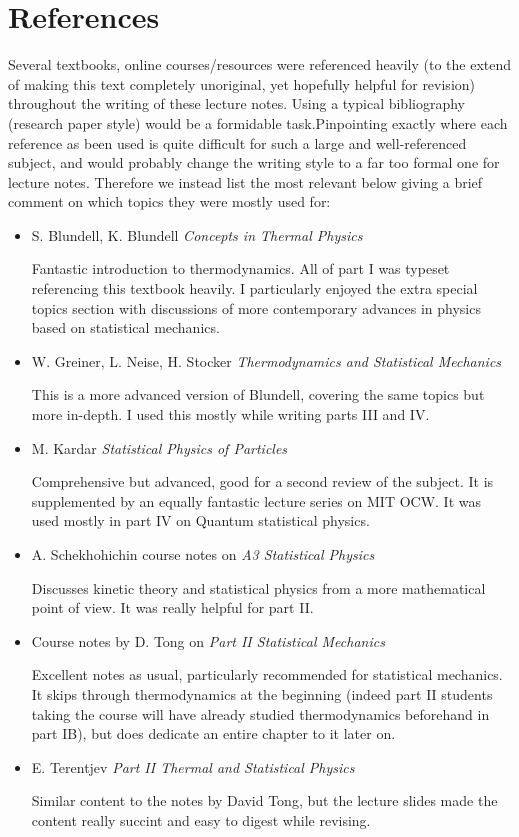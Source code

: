 \documentclass[a4paper,11pt,oneside]{book}
\begin{document}
\chapter*{References}
Several textbooks, online courses/resources were referenced heavily (to the extend of making this text completely unoriginal, yet hopefully helpful for revision) throughout the writing of these lecture notes. Using a typical bibliography (research paper style) would be a formidable task.Pinpointing exactly where each reference as been used is quite difficult for such a large and well-referenced subject, and would probably change the writing style to a far too formal one for lecture notes. Therefore we instead list the most relevant below giving a brief comment on which topics they were mostly used for:
\begin{itemize}
 \item {\sffamily S. Blundell, K. Blundell \textit{Concepts in Thermal Physics}}
 
 Fantastic introduction to thermodynamics. All of part I was typeset referencing this textbook heavily. I particularly enjoyed the extra special topics section with discussions of more contemporary advances in physics based on statistical mechanics. 
  \item {\sffamily W. Greiner, L. Neise, H. Stocker \textit{Thermodynamics and Statistical Mechanics}}
  
 This is a more advanced version of Blundell, covering the same topics but more in-depth. I used this mostly while writing parts III and IV.
  \item {\sffamily M. Kardar \textit{Statistical Physics of Particles}}
  
Comprehensive but advanced, good for a second review of the subject. It is supplemented by an equally fantastic lecture series on MIT OCW. It was used mostly in part IV on Quantum statistical physics. 
 \item {\sffamily A. Schekhohichin course notes on \textit{A3 Statistical Physics}}
 
 Discusses kinetic theory and statistical physics from a more mathematical point of view. It was really helpful for part II.
 
 \item {\sffamily Course notes by D. Tong on \textit{Part II Statistical Mechanics}}
 
 Excellent notes as usual, particularly recommended for statistical mechanics. It skips through thermodynamics at the beginning (indeed part II students taking the course will have already studied thermodynamics beforehand in part IB), but does dedicate an entire chapter to it later on. 
 \item {\sffamily E. Terentjev \textit{Part II Thermal and Statistical Physics}}
 
 Similar content to the notes by David Tong, but the lecture slides made the content really succint and easy to digest while revising.
\end{itemize}
\end{document}
